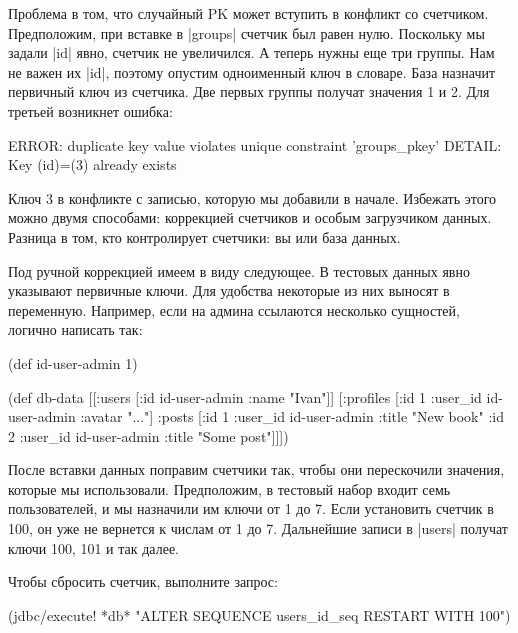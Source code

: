 Проблема в том, что случайный PK может вступить в конфликт со
счетчиком. Предположим, при вставке в \spverb|groups| счетчик был равен
нулю. Поскольку мы задали \spverb|id| явно, счетчик не увеличился. А теперь
нужны еще три группы. Нам не важен их \spverb|id|, поэтому опустим одноименный
ключ в словаре.  База назначит первичный ключ из счетчика. Две первых группы
получат значения 1 и 2. Для третьей возникнет ошибка:

\begin{english}
  \begin{text}
ERROR:  duplicate key value violates unique constraint 'groups_pkey'
DETAIL:  Key (id)=(3) already exists
  \end{text}
\end{english}

Ключ 3 в конфликте с записью, которую мы добавили в начале. Избежать этого можно
двумя способами: коррекцией счетчиков и особым загрузчиком данных. Разница в
том, кто контролирует счетчики: вы или база данных.

Под ручной коррекцией имеем в виду следующее. В тестовых данных явно указывают
первичные ключи. Для удобства некоторые из них выносят в переменную. Например,
если на админа ссылаются несколько сущностей, логично написать так:

\begin{english}
  \begin{clojure}
(def id-user-admin 1)

(def db-data
  [[:users [{:id id-user-admin :name "Ivan"}]]
   [:profiles [{:id 1 :user_id id-user-admin :avatar "..."}]
    :posts [{:id 1 :user_id id-user-admin :title "New book"}
            {:id 2 :user_id id-user-admin :title "Some post"}]]])
  \end{clojure}
\end{english}

После вставки данных поправим счетчики так, чтобы они перескочили значения,
которые мы использовали. Предположим, в тестовый набор входит семь
пользователей, и мы назначили им ключи от 1 до 7. Если установить счетчик в 100,
он уже не вернется к числам от 1 до 7. Дальнейшие записи в \spverb|users|
получат ключи 100, 101 и так далее.

Чтобы сбросить счетчик, выполните запрос:

\begin{english}
  \begin{clojure}
(jdbc/execute! *db* "ALTER SEQUENCE users_id_seq RESTART WITH 100")
  \end{clojure}
\end{english}

